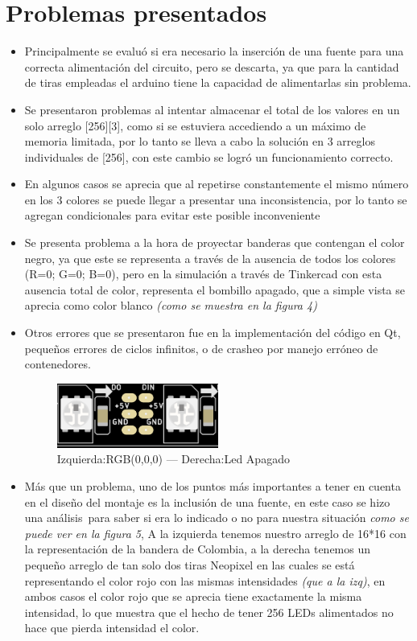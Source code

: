 \documentclass{article}
\begin{document}
\section{Problemas presentados}
\begin{itemize}
    \item Principalmente se evaluó si era necesario la inserción de una fuente para una correcta alimentación del circuito, pero se descarta, ya que para la cantidad de tiras empleadas el arduino tiene la capacidad de alimentarlas sin problema.
    \item Se presentaron problemas al intentar almacenar el total de los valores en un solo arreglo [256][3], como si se estuviera accediendo a un máximo de memoria limitada, por lo tanto se lleva a cabo la solución en 3 arreglos individuales de [256], con este cambio se logró un funcionamiento correcto.
    \item En algunos casos se aprecia que al repetirse constantemente el mismo número en los 3 colores se puede llegar a presentar una inconsistencia, por lo tanto se agregan condicionales para evitar este posible inconveniente
    \item Se presenta problema a la hora de proyectar banderas que contengan el color negro, ya que este se representa a través de la ausencia de todos los colores (R=0; G=0; B=0), pero en la simulación a través de Tinkercad con esta ausencia total de color, representa el bombillo apagado, que a simple vista se aprecia como color blanco \textit{(como se muestra en la figura 4)}
    \item Otros errores que se presentaron fue en la implementación del código en Qt, pequeños errores de ciclos infinitos, o de crasheo por manejo erróneo de contenedores.
    \begin{figure}[h]
    \centering
    \includegraphics[width=0.5\textwidth]{error1.png}
    \caption{Izquierda:RGB(0,0,0) --- Derecha:Led Apagado }
    \label{fig:error1}
    \end{figure}
    \item Más que un problema, uno de los puntos más importantes a tener en cuenta en el diseño del montaje es la inclusión de una fuente, en este caso se hizo una análisis para saber si era lo indicado o no para nuestra situación \textit{como se puede ver en la figura 5}, A la izquierda tenemos nuestro arreglo de 16*16 con la representación de la bandera de Colombia, a la derecha tenemos un pequeño arreglo de tan solo dos tiras Neopixel en las cuales se está representando el color rojo con las mismas intensidades \textit{(que a la izq)}, en ambos casos el color rojo que se aprecia tiene exactamente la misma intensidad, lo que muestra que el hecho de tener 256 LEDs alimentados no hace que pierda intensidad el color.

\end{itemize}
\end{document}
